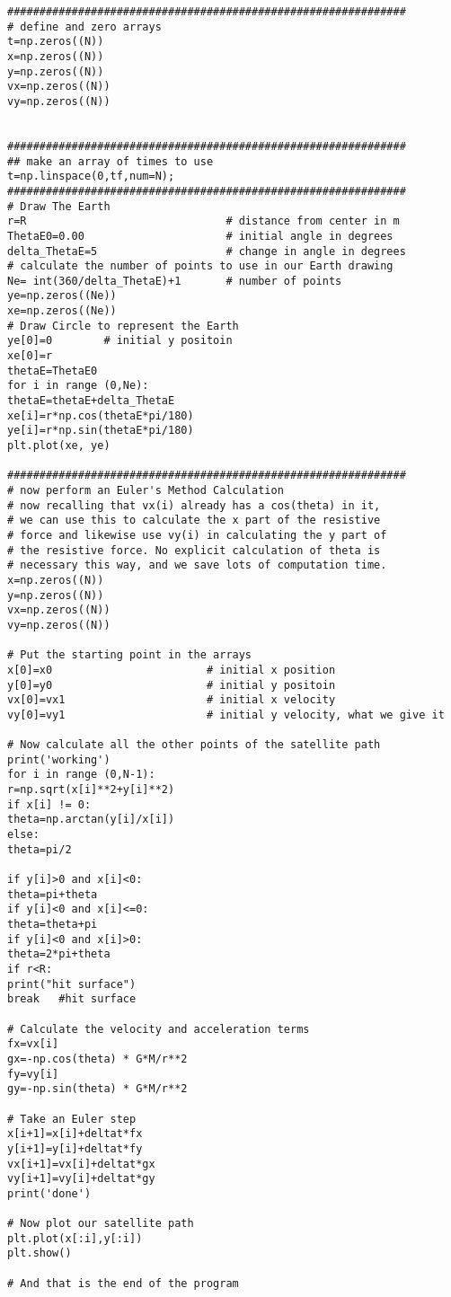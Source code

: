 \begin{small}
\begin{verbatim}
##############################################################
# define and zero arrays
t=np.zeros((N))
x=np.zeros((N))
y=np.zeros((N))
vx=np.zeros((N))
vy=np.zeros((N))


##############################################################
## make an array of times to use
t=np.linspace(0,tf,num=N);
##############################################################
# Draw The Earth
r=R                               # distance from center in m
ThetaE0=0.00                      # initial angle in degrees
delta_ThetaE=5                    # change in angle in degrees
# calculate the number of points to use in our Earth drawing
Ne= int(360/delta_ThetaE)+1       # number of points
ye=np.zeros((Ne))
xe=np.zeros((Ne))
# Draw Circle to represent the Earth
ye[0]=0        # initial y positoin
xe[0]=r
thetaE=ThetaE0
for i in range (0,Ne):
thetaE=thetaE+delta_ThetaE
xe[i]=r*np.cos(thetaE*pi/180)
ye[i]=r*np.sin(thetaE*pi/180)
plt.plot(xe, ye)

##############################################################
# now perform an Euler's Method Calculation
# now recalling that vx(i) already has a cos(theta) in it,
# we can use this to calculate the x part of the resistive
# force and likewise use vy(i) in calculating the y part of
# the resistive force. No explicit calculation of theta is
# necessary this way, and we save lots of computation time.
x=np.zeros((N))
y=np.zeros((N))
vx=np.zeros((N))
vy=np.zeros((N))

# Put the starting point in the arrays
x[0]=x0                        # initial x position
y[0]=y0                        # initial y positoin
vx[0]=vx1                      # initial x velocity
vy[0]=vy1                      # initial y velocity, what we give it

# Now calculate all the other points of the satellite path
print('working')
for i in range (0,N-1):
r=np.sqrt(x[i]**2+y[i]**2)
if x[i] != 0:
theta=np.arctan(y[i]/x[i])
else:
theta=pi/2

if y[i]>0 and x[i]<0:
theta=pi+theta
if y[i]<0 and x[i]<=0:
theta=theta+pi
if y[i]<0 and x[i]>0:
theta=2*pi+theta
if r<R:
print("hit surface")
break   #hit surface

# Calculate the velocity and acceleration terms   
fx=vx[i]
gx=-np.cos(theta) * G*M/r**2
fy=vy[i]
gy=-np.sin(theta) * G*M/r**2

# Take an Euler step
x[i+1]=x[i]+deltat*fx
y[i+1]=y[i]+deltat*fy
vx[i+1]=vx[i]+deltat*gx
vy[i+1]=vy[i]+deltat*gy   
print('done')

# Now plot our satellite path 
plt.plot(x[:i],y[:i])
plt.show()

# And that is the end of the program
	
	\end{verbatim}
\endgroup
	
\end{small}


